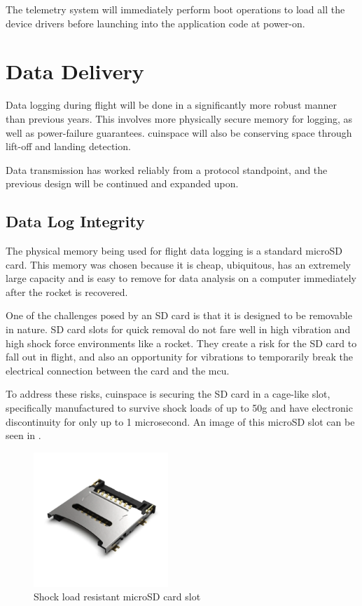 The telemetry system will immediately perform boot operations to load all the device drivers before launching into the
application code at power-on.

\section{Data Delivery}

Data logging during flight will be done in a significantly more robust manner than previous years. This involves more
physically secure memory for logging, as well as power-failure guarantees. \Gls{cuinspace} will also be conserving
space through lift-off and landing detection.

Data transmission has worked reliably from a protocol standpoint, and the previous design will be continued and
expanded upon.

\subsection{Data Log Integrity}

The physical memory being used for flight data logging is a standard microSD card. This memory was chosen because it is
cheap, ubiquitous, has an extremely large capacity and is easy to remove for data analysis on a computer immediately
after the rocket is recovered.

One of the challenges posed by an SD card is that it is designed to be removable in nature. SD card slots for quick
removal do not fare well in high vibration and high shock force environments like a rocket. They create a risk for the
SD card to fall out in flight, and also an opportunity for vibrations to temporarily break the electrical connection
between the card and the \gls{mcu}.

To address these risks, \gls{cuinspace} is securing the SD card in a cage-like slot, specifically manufactured to
survive shock loads of up to 50g and have electronic discontinuity for only up to 1 microsecond.
\cite{sd-cage-datasheet} An image of this microSD slot can be seen in .

\begin{figure}[H]
    \centering
    \includegraphics[width=2in]{./assets/images/sd-card-cage.png}
    \caption{Shock load resistant microSD card slot \cite{sd-card-cage}}
    \label{fig:sd-card-cage}
\end{figure}

